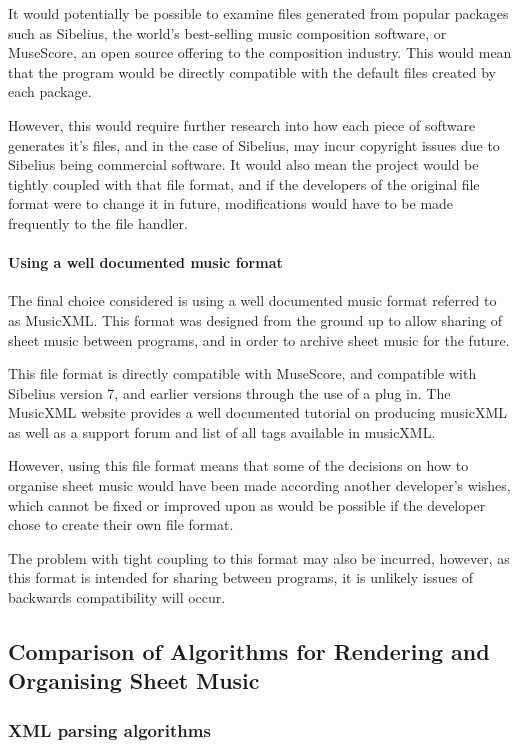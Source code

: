 It would potentially be possible to examine files generated from popular packages such as Sibelius, the world's best-selling music composition software, \parencite{avid} or MuseScore, an open source offering to the composition industry. This would mean that the program would be directly compatible with the default files created by each package.

However, this would require further research into how each piece of software generates it's files, and in the case of Sibelius, may incur copyright issues due to Sibelius being commercial software. It would also mean the project would be tightly coupled with that file format, and if the developers of the original file format were to change it in future, modifications would have to be made frequently to the file handler.

\paragraph{Using a well documented music format}
The final choice considered is using a well documented music format referred to as MusicXML. This format was designed from the ground up to allow sharing of sheet music between programs, and in order to archive sheet music for the future. \parencite{mxml}

This file format is directly compatible with MuseScore, \parencite{MuseTour} and compatible with Sibelius version 7, and earlier versions through the use of a plug in. \parencite{Plugin} The MusicXML website provides a well documented tutorial on producing musicXML as well as a support forum and list of all tags available in musicXML.

However, using this file format means that some of the decisions on how to organise sheet music would have been made according another developer's wishes, which cannot be fixed or improved upon as would be possible if the developer chose to create their own file format.

The problem with tight coupling to this format may also be incurred, however, as this format is intended for sharing between programs, it is unlikely issues of backwards compatibility will occur.

\subsection{Comparison of Algorithms for Rendering and Organising Sheet Music}
\subsubsection{XML parsing algorithms}
